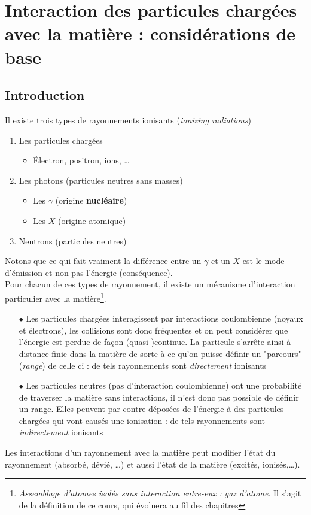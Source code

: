 \chapter{Interaction des particules chargées avec la matière : considérations de base}
\section{Introduction}
Il existe trois types de rayonnements ionisants (\textit{ionizing radiations})
\begin{enumerate}
\item Les particules chargées
\begin{itemize}
\item Électron, positron, ions, \dots
\end{itemize}
\item Les photons (particules neutres sans masses)
	\begin{itemize}
	\item Les $\gamma$ (origine \textbf{nucléaire})
	\item Les $X$ (origine atomique)
	\end{itemize}
\item Neutrons (particules neutres)
\end{enumerate}
Notons que ce qui fait vraiment la différence entre un $\gamma$ et un $X$ est le mode 
d'émission et non pas l'énergie (conséquence).\\

Pour chacun de ces types de rayonnement, il existe un mécanisme d'interaction particulier
avec la matière\footnote{\textit{Assemblage d'atomes isolés sans interaction entre-eux : 
gaz d'atome}. Il s'agit de la définition de ce cours, qui évoluera au fil des chapitres}. 
\begin{itemize}
\item[$\bullet$] Les particules chargées interagissent par interactions coulombienne 
(noyaux et électrons), les collisions sont donc fréquentes et on peut considérer que 
l'énergie est perdue de façon (quasi-)continue. La particule s'arrête ainsi à distance 
finie dans la matière de sorte à ce qu'on puisse définir un "parcours" (\textit{range}) 
de celle ci  : de tels rayonnements sont \textit{directement} ionisants
\item[$\bullet$] Les particules neutres (pas d'interaction coulombienne) ont une 
probabilité de traverser la matière sans interactions, il n'est donc pas possible de 
définir un range. Elles peuvent par contre déposées de l'énergie à des particules 
chargées qui vont causés une ionisation : de tels rayonnements sont \textit{indirectement} 
ionisants
\end{itemize}
Les interactions d'un rayonnement avec la matière peut modifier l'état du rayonnement 
(absorbé, dévié, \dots) et aussi l'état de la matière (excités, ionisés,\dots).

